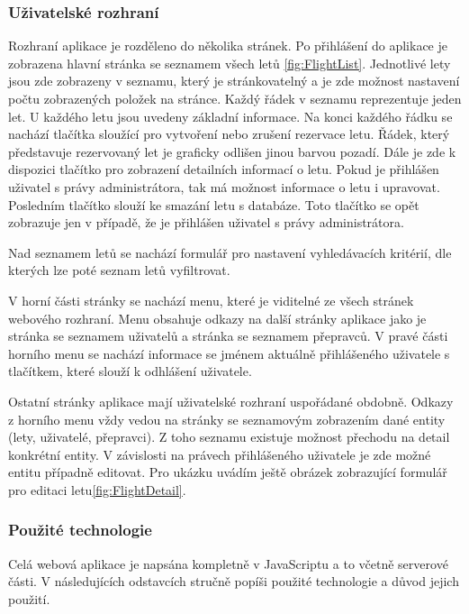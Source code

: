 \documentclass[ing,male,java,dept460]{diploma}						%
\begin{document}
\subsubsection{Uživatelské rozhraní}
Rozhraní aplikace je rozděleno do několika stránek. Po přihlášení do aplikace je zobrazena hlavní stránka se seznamem všech letů \ref{fig:FlightList}. Jednotlivé lety jsou zde zobrazeny v seznamu, který je stránkovatelný a je zde možnost nastavení počtu zobrazených položek na stránce. Každý řádek v seznamu reprezentuje jeden let. U každého letu jsou uvedeny základní informace. Na konci každého řádku se nachází tlačítka sloužící pro vytvoření nebo zrušení rezervace letu. Řádek, který představuje rezervovaný let je graficky odlišen jinou barvou pozadí. Dále je zde k dispozici tlačítko pro zobrazení detailních informací o letu. Pokud je přihlášen uživatel s právy administrátora, tak má možnost informace o letu i upravovat. Posledním tlačítko slouží ke smazání letu s databáze. Toto tlačítko se opět zobrazuje jen v případě, že je přihlášen uživatel s právy administrátora.


Nad seznamem letů se nachází formulář pro nastavení vyhledávacích kritérií, dle kterých lze poté seznam letů vyfiltrovat.

V horní části stránky se nachází menu, které je viditelné ze všech stránek webového rozhraní. Menu obsahuje odkazy na další stránky aplikace jako je stránka se seznamem uživatelů a stránka se seznamem přepravců. V pravé části horního menu se nachází informace se jménem aktuálně přihlášeného uživatele s tlačítkem, které slouží k odhlášení uživatele.

Ostatní stránky aplikace mají uživatelské rozhraní uspořádané obdobně. Odkazy z horního menu vždy vedou na stránky se seznamovým zobrazením dané entity (lety, uživatelé, přepravci). Z toho seznamu existuje možnost přechodu na detail konkrétní entity. V závislosti na právech přihlášeného uživatele je zde možné entitu případně editovat. Pro ukázku uvádím ještě obrázek zobrazující formulář pro editaci letu\ref{fig:FlightDetail}.


\subsubsection{Použité technologie}
\label{sec:Pouzite_technologie}
Celá webová aplikace je napsána kompletně v JavaScriptu a to včetně serverové části. V následujících odstavcích stručně popíši použité technologie a důvod jejich použití.
\end{document}
